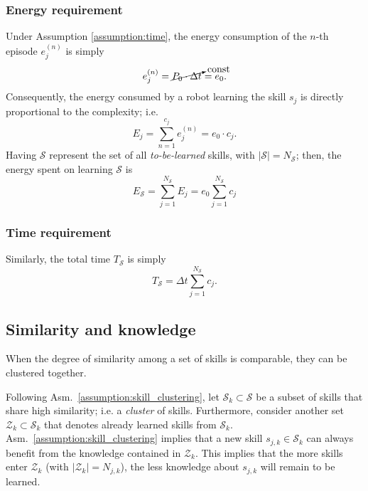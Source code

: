 \subsubsection{\textbf{Energy requirement}}
Under Assumption \ref{assumption:time}, the energy consumption of the $n$-th episode $e^{(n)}_j$ is simply
\begin{equation}\label{eq:energy_per_episode}
    e^{(n)}_j = \cancelto{\text{const}}{P_0\cdot \Delta t} = e_0.
\end{equation}
Consequently, the energy consumed by a robot learning the skill $ s_j $ is directly proportional to the complexity; i.e.
\begin{equation}\label{eq:energy_per_skill}
    E_j =\sum_{n=1}^{c_j} e^{(n)}_j = e_0 \cdot c_j.
\end{equation}
Having $\mathcal{S}$ represent the set of all \emph{to-be-learned} skills, with $|\mathcal{S}| = N_\mathcal{S}$; then, the energy spent on learning $\mathcal{S}$ is
\begin{equation}\label{eq:total_energy}
	E_{\mathcal{S}} = \sum_{j=1}^{{N_{\mathcal{S}}}} E_j = e_0 \sum_{j=1}^{{N_{\mathcal{S}}}} c_j%
\end{equation}
\subsubsection{\textbf{Time requirement}}
Similarly, the total time $T_{\mathcal{S}}$ is simply
\begin{equation}\label{eq:total_energy}
	T_{\mathcal{S}} = \Delta t \sum_{j=1}^{{N_{\mathcal{S}}}} c_j.
\end{equation}
\subsection{Similarity and knowledge}
\begin{tcolorbox}
	\begin{assumption}\label{assumption:skill_clustering} When the degree of similarity among a set of skills is comparable, they can be clustered together.
		\end{assumption}
\end{tcolorbox}
Following Asm.~\ref{assumption:skill_clustering}, let $\mathcal{S}_k \subset \mathcal{S}$ be a subset of skills that share high similarity; i.e. a \emph{cluster} of skills. Furthermore, consider another set $\mathcal{Z}_k \subset \mathcal{S}_k$ that denotes already learned skills from $\mathcal{S}_k$. Asm.~\ref{assumption:skill_clustering} implies that a new skill $s_{j,k} \in \mathcal{S}_k$ can always benefit from the knowledge contained in $\mathcal{Z}_k$. This implies that the more skills enter $\mathcal{Z}_k$ (with $|\mathcal{Z}_k| = N_{j,k}$), the less knowledge about $ s_{j,k} $ will remain to be learned.


